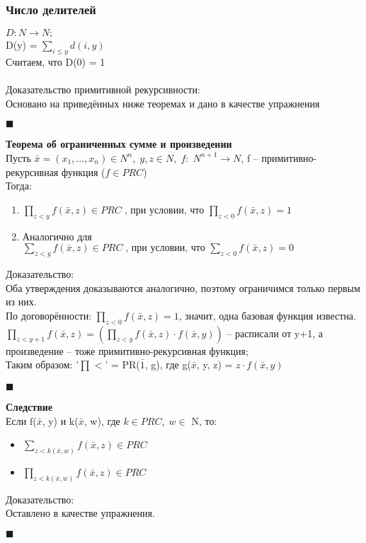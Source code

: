 \documentclass{article}
\begin{document}
\subsubsection{Число делителей}
    $D: N \rightarrow N;$\\
    D(y) = 
    $\sum\limits_{i \leq y} d(i, y)$
    \\Считаем, что D(0) = 1\\
    \\Доказательство примитивной рекурсивности:\\
    Основано на приведённых ниже теоремах и дано в качестве упражнения
    \begin{flushright}
        $\blacksquare$
    \end{flushright}
    \textbf{Теорема об ограниченных сумме и произведении}\\
    Пусть $\bar x = (x_{1}, ... , x_{n}) \in N^{n},\; y, z \in N,\; f:\;N^{n+1} \rightarrow N$, f -- примитивно-рекурсивная функция ($f \in PRC$)\\
    Тогда:
    \begin{enumerate}
        \item $\prod\limits_{z < y}f(\bar x , z) \in PRC\;\text{, при условии, что }\prod\limits_{z < 0}f(\bar x , z) = 1$
        \item Аналогично для $\sum\limits_{z < y}f(\bar x , z) \in PRC\;\text{, при условии, что }\sum\limits_{z < 0}f(\bar x , z) = 0$
    \end{enumerate}
    Доказательство:\\
    Оба утверждения доказываются аналогично, поэтому ограничимся только первым из них.\\
    По договорённости: $\prod\limits_{z < 0}f(\bar x , z) = 1$, значит, одна базовая функция известна.\\
    $\prod\limits_{z < y+1}f(\bar x , z) = (\prod\limits_{z < y}f(\bar x , z) \cdot f(\bar x, y))$ -- расписали от y+1, а произведение -- тоже примитивно-рекурсивная функция;\\
    Таким образом: '$\prod\limits_{}<$' = PR($\bar 1$, g), где g($\bar x$, y, z) = $z \cdot f(\bar x, y)$
    \begin{flushright}
        $\blacksquare$
    \end{flushright}
    \textbf{Следствие}\\
    Если f($\bar x$, y) и k($\bar x$, w), где $k \in PRC,\; w\in$ N, то:\\
    \begin{itemize}
        \item $\sum\limits_{z < k(\bar x, w)}f(\bar x , z) \in PRC$
        \item $\prod\limits_{z < k(\bar x, w)}f(\bar x , z) \in PRC$
    \end{itemize}
    Доказательство:\\
    Оставлено в качестве упражнения.
    \begin{flushright}
        $\blacksquare$
    \end{flushright}
    
\end{document}
